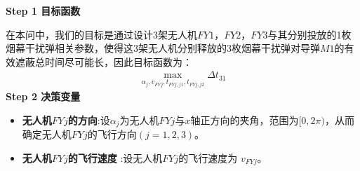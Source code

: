 \documentclass[../main.tex]{subfiles}
\begin{document}
\noindent \textbf{Step 1 目标函数}
\par 在本问中，我们的目标是通过设计3架无人机$FY1$，$FY2$，$FY3$与其分别投放的1枚烟幕干扰弹相关参数，使得这3架无人机分别释放的3枚烟幕干扰弹对导弹$M1$的有效遮蔽总时间尽可能长，因此目标函数为：
\begin{align}\label{19.1}
  \underset{\alpha_j ,v_{FYj},t_{FYj,j1},t_{FYj,j2}}{\max}\Delta t_{31}
\end{align}
\noindent \textbf{Step 2 决策变量}

\begin{itemize}
\item \textbf{无人机$FYj$的方向}:设$\alpha_j$为无人机$FYj$与$x$轴正方向的夹角，范围为$[ 0,2\pi ) $，从而确定无人机$FYj$的飞行方向$(j=1,2,3)$。
\item  \textbf{无人机$FYj$的飞行速度} :设无人机$FYj$的飞行速度为 \( v_{FYj} \)。


\end{itemize}
\end{document}
